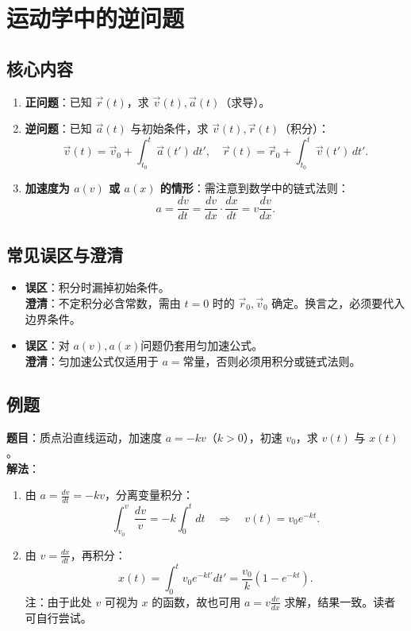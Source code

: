 \documentclass[UTF8]{ctexart}
\begin{document}
	\section{运动学中的逆问题}
	\subsection*{核心内容}
	\begin{enumerate}
		\item \textbf{正问题}：已知 $\vec{r}(t)$，求 $\vec{v}(t), \vec{a}(t)$（求导）。
		\item \textbf{逆问题}：已知 $\vec{a}(t)$ 与初始条件，求 $\vec{v}(t), \vec{r}(t)$（积分）：
		\[
		\vec{v}(t) = \vec{v}_0 + \int_{t_0}^{t} \vec{a}(t')\,dt',\quad
		\vec{r}(t) = \vec{r}_0 + \int_{t_0}^{t} \vec{v}(t')\,dt'.
		\]
		\item \textbf{加速度为 $a(v)$ 或 $a(x)$ 的情形}：需注意到数学中的链式法则：
		\[
		a = \frac{dv}{dt} = \frac{dv}{dx}\cdot\frac{dx}{dt} = v\frac{dv}{dx}.
		\]
	\end{enumerate}
	
	\subsection*{常见误区与澄清}
	\begin{itemize}
		\item \textbf{误区}：积分时漏掉初始条件。\\
		\textbf{澄清}：不定积分必含常数，需由 $t=0$ 时的 $\vec{r}_0, \vec{v}_0$ 确定。换言之，必须要代入边界条件。
		\item \textbf{误区}：对 $a(v), a(x)$问题仍套用匀加速公式。\\
		\textbf{澄清}：匀加速公式仅适用于 $a = \text{常量}$，否则必须用积分或链式法则。
	\end{itemize}
	
	\subsection*{例题}
	\textbf{题目}：质点沿直线运动，加速度 $a = -kv$（$k>0$），初速 $v_0$，求 $v(t)$ 与 $x(t)$。\\
	\textbf{解法}：
	\begin{enumerate}
		\item 由 $a = \frac{dv}{dt} = -kv$，分离变量积分：
		\[
		\int_{v_0}^{v} \frac{dv}{v} = -k\int_0^t dt \quad\Rightarrow\quad v(t) = v_0 e^{-kt}.
		\]
		\item 由 $v = \frac{dx}{dt}$，再积分：
		\[
		x(t) = \int_0^t v_0 e^{-kt'} dt' = \frac{v_0}{k}(1 - e^{-kt}).
		\]
		注：由于此处 $v$ 可视为 $x$ 的函数，故也可用 $a = v\frac{dv}{dx}$ 求解，结果一致。读者可自行尝试。
	\end{enumerate}
	
\end{document}
